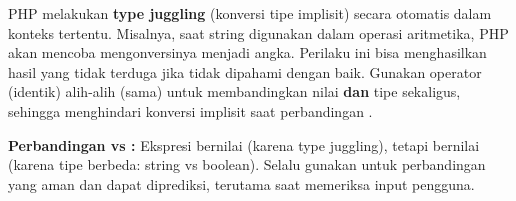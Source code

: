 
PHP melakukan \textbf{type juggling} (konversi tipe implisit) secara otomatis dalam konteks tertentu. Misalnya, saat string digunakan dalam operasi aritmetika, PHP akan mencoba mengonversinya menjadi angka. Perilaku ini bisa menghasilkan hasil yang tidak terduga jika tidak dipahami dengan baik. Gunakan operator \code{===} (identik) alih-alih \code{==} (sama) untuk membandingkan nilai \textbf{dan} tipe sekaligus, sehingga menghindari konversi implisit saat perbandingan \cite{phpRightWay}.

\begin{catatan}
\textbf{Perbandingan \code{==} vs \code{===}:} Ekspresi  bernilai  (karena type juggling), tetapi  bernilai  (karena tipe berbeda: string vs boolean). Selalu gunakan \code{===} untuk perbandingan yang aman dan dapat diprediksi, terutama saat memeriksa input pengguna.
\end{catatan}

